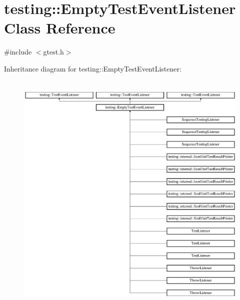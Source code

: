 \hypertarget{classtesting_1_1_empty_test_event_listener}{}\section{testing\+::Empty\+Test\+Event\+Listener Class Reference}
\label{classtesting_1_1_empty_test_event_listener}


{\ttfamily \#include $<$gtest.\+h$>$}

Inheritance diagram for testing\+::Empty\+Test\+Event\+Listener\+:\begin{figure}[H]
\begin{center}
\leavevmode
\includegraphics[height=12.000000cm]{dd/dff/classtesting_1_1_empty_test_event_listener}
\end{center}
\end{figure}
